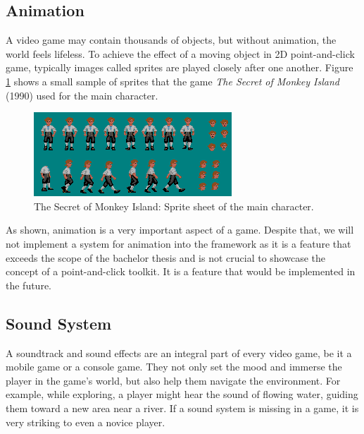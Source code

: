 \subsection{Animation}
\label{sec:Animation}
A video game may contain thousands of objects, but without animation, the world feels lifeless.  To achieve the effect of a moving object in 2D point-and-click game, typically images called sprites are played closely after one another.  Figure \ref{fig:A-TSoMI} shows a small sample of sprites that the game \textit{The Secret of Monkey Island} (1990) used for the main character.

\begin{figure}[H]
\centering
\includegraphics[width=.65\linewidth]{img/AN-TSoMI2.png}
\caption{The Secret of Monkey Island: Sprite sheet of the main character.}
\label{fig:A-TSoMI}
\end{figure}

\begin{notImplemented}
 \par
\vspace{3mm}
As shown, animation is a very important aspect of a game. Despite that, we will not implement a system for animation into the framework as it is a feature that exceeds the scope of the bachelor thesis and is not crucial to showcase the concept of a point-and-click toolkit. It is a feature that would be implemented in the future.
\end{notImplemented}

\subsection{Sound System}
\label{sec:Sound_Management}
A soundtrack and sound effects are an integral part of every video game, be it a mobile game or a console game. They not only set the mood and immerse the player in the game's world, but also help them navigate the environment. For example, while exploring, a player might hear the sound of flowing water, guiding them toward a new area near a river. If a sound system is missing in a game, it is very striking to even a novice player. 

